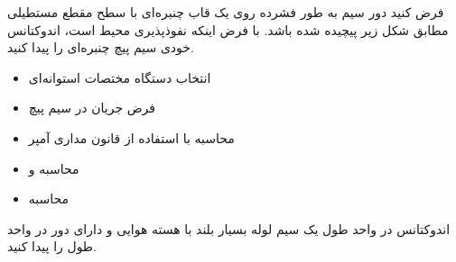 \begin{ELexample}{}

فرض کنید  دور سیم به طور فشرده روی یک قاب چنبره‌ای با سطح مقطع مستطیلی مطابق شکل زیر پیچیده شده باشد. با فرض اینکه نفوذپذیری محیط  است، اندوکتانس خودی سیم پیچ چنبره‌ای را پیدا کنید.


\begin{ELsolution}

\begin{itemize}
\tightlist
\item
  انتخاب دستگاه مختصات استوانه‌ای
\item
  فرض جریان  در سیم پیچ
\item
  محاسبه  با استفاده از قانون مداری آمپر
\end{itemize}


\begin{itemize}
\tightlist
\item
  محاسبه \ELim{\Phi} و \ELim{\Lambda}
\end{itemize}


\begin{itemize}
\tightlist
\item
  محاسبه 
\end{itemize}


\end{ELsolution}

\end{ELexample}


\begin{ELexample}{}

اندوکتانس در واحد طول یک سیم لوله بسیار بلند با هسته هوایی و دارای  دور در واحد طول را پیدا کنید.

\begin{ELsolution}


\end{ELsolution}

\end{ELexample}


